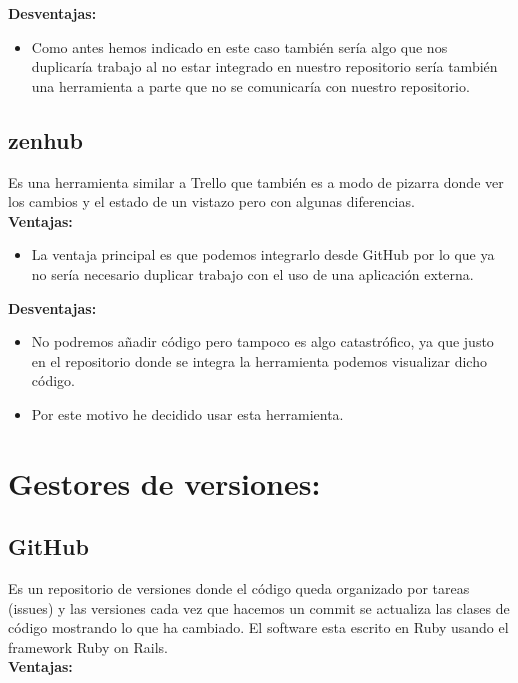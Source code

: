 \textbf{Desventajas:}

\begin{itemize}
\item Como antes hemos indicado en este caso también sería algo que nos duplicaría trabajo al no estar integrado en nuestro repositorio sería también una herramienta a parte que no se comunicaría con nuestro repositorio.
\end{itemize}


\subsection{zenhub}
Es una herramienta similar a Trello que también es a modo de pizarra donde ver los cambios y el estado de un vistazo pero con algunas diferencias.
\\

\textbf{Ventajas:}

\begin{itemize}
\item La ventaja principal es que podemos integrarlo desde GitHub por lo que ya no sería necesario duplicar trabajo con el uso de una aplicación externa.
\end{itemize}

\textbf{Desventajas:}

\begin{itemize}
\item No podremos añadir código pero tampoco es algo catastrófico, ya que justo en el repositorio donde se integra la herramienta podemos visualizar dicho código.

\item Por este motivo he decidido usar esta herramienta.
\end{itemize}

\section{Gestores de versiones:}
\subsection{GitHub}
Es un repositorio de versiones donde el código queda organizado por tareas (issues) y las versiones cada vez que hacemos un commit se actualiza las clases de código mostrando lo que ha cambiado.
El software esta escrito en Ruby usando el framework Ruby on Rails.
\\


\textbf{Ventajas:}

